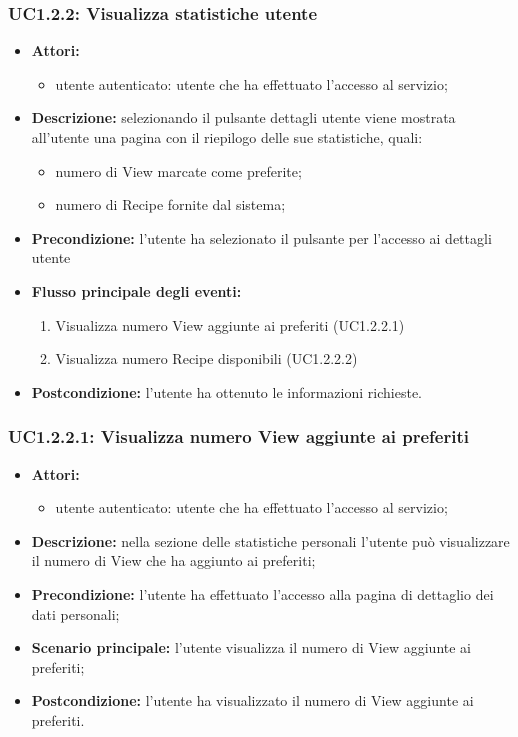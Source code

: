 \subsubsection{UC1.2.2: Visualizza statistiche utente}
\begin{itemize}
	\item \textbf{Attori:}
	\begin{itemize}
		\item utente autenticato: utente che ha effettuato l'accesso al servizio;
	\end{itemize}
	\item \textbf{Descrizione:} selezionando il pulsante dettagli utente viene mostrata all'utente una pagina con il riepilogo delle sue statistiche, quali:
	\begin{itemize}
		\item numero di View marcate come preferite;
		\item numero di Recipe fornite dal sistema;
	\end{itemize}
  \item \textbf{Precondizione:} l'utente ha selezionato il pulsante per l'accesso ai dettagli utente
	\item \textbf{Flusso principale degli eventi:}
	\begin{enumerate}
		\item Visualizza numero View aggiunte ai preferiti (UC1.2.2.1)
		\item Visualizza numero Recipe disponibili (UC1.2.2.2)
	\end{enumerate}
	\item \textbf{Postcondizione:} l'utente ha ottenuto le informazioni richieste.
\end{itemize}

\subsubsection{UC1.2.2.1: Visualizza numero View aggiunte ai preferiti}
\begin{itemize}
	\item \textbf{Attori:}
	\begin{itemize}
		\item utente autenticato: utente che ha effettuato l'accesso al servizio;
	\end{itemize}
	\item \textbf{Descrizione:} nella sezione delle statistiche personali l'utente può visualizzare il numero di View che ha aggiunto ai preferiti;
	\item \textbf{Precondizione:} l'utente ha effettuato l'accesso alla pagina di dettaglio dei dati personali;
	\item \textbf{Scenario principale:} l'utente visualizza il numero di View aggiunte ai preferiti;
	\item \textbf{Postcondizione:} l'utente ha visualizzato il numero di View aggiunte ai preferiti.
\end{itemize}

